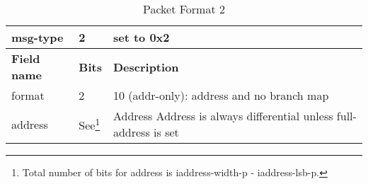 \begin{table}[htp]
    \centering
    \caption{Packet Format 2}
    \label{tab:te_inst2}
    \begin{tabulary}{\textwidth}{|l|l|p{100mm}|}
        \hline
        msg-type & 2 & set to 0x2 \\
        \hline
        {\bf Field name} & {\bf Bits} & {\bf Description} \\
        \hline
        format	& 2	& 10 (addr-only): address and no branch map\\
        \hline
        address & See\footnote {\label{addressbitslsbmsb}Total number of bits for address is iaddress-width-p - iaddress-lsb-p.} & Address \newline
        Address is always differential unless full-address is set\\ 
        \hline
    \end{tabulary}
\end{table}

